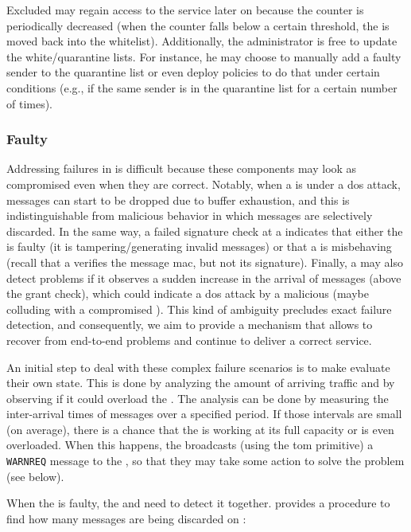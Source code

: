 Excluded \senders may regain access to the service later on because the counter is periodically decreased (when the counter falls below a certain threshold, the \sender is moved back into the whitelist). 
Additionally, the administrator is free to update the white/quarantine lists. 
For instance, he may choose to manually add a faulty sender to the quarantine list or even deploy policies to do that under certain conditions (e.g., if the same sender is in the quarantine list for a certain number of times).


\subsubsection{Faulty \Presieve}
\label{faultypresieve}
Addressing failures in \presieves is difficult because these components may look as compromised even when they are correct.
Notably, when a \presieve is under a \gls{dos} attack, messages can start to be dropped due to buffer exhaustion, and this is indistinguishable from malicious behavior in which messages are selectively discarded.
In the same way, a failed signature check at a \repsieve indicates that either the \presieve is faulty (it is tampering/generating invalid messages) or that a \sender is misbehaving (recall that a \presieve verifies the message \gls{mac}, but not its signature).
Finally, a \repsieve may also detect problems if it observes a sudden increase in the arrival of messages (above the grant check), which could indicate a \gls{dos} attack by a malicious \presieve (maybe colluding with a compromised \sender).
This kind of ambiguity precludes exact failure detection, and consequently, we aim to provide a mechanism that allows \sieveq to recover from end-to-end problems and continue to deliver a correct service.

An initial step to deal with these complex failure scenarios is to make \presieves evaluate their own state.
This is done by analyzing the amount of arriving traffic and by observing if it could overload the \presieve.
The analysis can be done by measuring the inter-arrival times of messages over a specified period.
If those intervals are small (on average), there is a chance that the \presieve is working at its full capacity or is even overloaded.
When this happens, the \presieve broadcasts (using the \gls{tom} primitive) a \texttt{WARNREQ} message to the \repsieves, so that they may take some action to solve the problem (see below).


When the \presieve is faulty, the \sender and \repsieves need to detect it together.
\sieveq provides a procedure to find how many messages are being discarded on \presieve:


